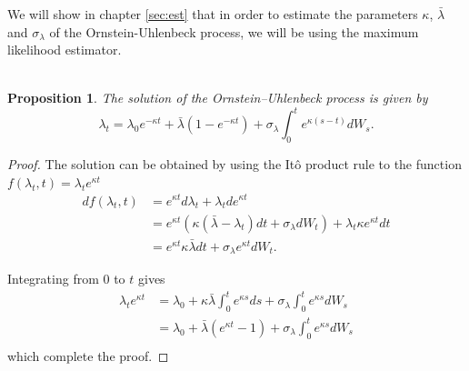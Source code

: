 \documentclass{article}
\newtheorem{prop}[thm]{Proposition}
\theoremstyle{definition}
\theoremstyle{remark}
\newcommand{\Ito}{It\^{o} }
\begin{document}
We will show in chapter \ref{sec:est} that in order to estimate the parameters $\kappa$, $\bar{\lambda}$ and $\sigma_\lambda$ of the Ornstein-Uhlenbeck process, we will be using the maximum likelihood estimator.\\
\\
\begin{prop}
The solution of the Ornstein--Uhlenbeck process is given by
\begin{equation*}
\lambda_t=\lambda_0e^{-\kappa t}+\bar{\lambda}(1-e^{-\kappa t})+\sigma_\lambda\int_0^t e^{\kappa (s-t)} dW_s.
\end{equation*}
\end{prop}

\begin{proof}
The solution can be obtained by using the \Ito product rule to the function $f(\lambda_t, t)=\lambda_te^{\kappa t}$
\begin{align*}
df(\lambda_t, t)&=e^{\kappa t}d\lambda_t+\lambda_tde^{\kappa t}\\
&=e^{\kappa t}\left(\kappa(\bar{\lambda}-\lambda_t)dt+\sigma_\lambda dW_t\right)+\lambda_t\kappa e^{\kappa t}dt\\
&=e^{\kappa t}\kappa\bar{\lambda}dt+\sigma_\lambda e^{\kappa t} dW_t.
\end{align*}

Integrating from $0$ to $t$ gives
\begin{align*}
\lambda_te^{\kappa t}&=\lambda_0+\kappa\bar{\lambda}\int_0^te^{\kappa s}ds+\sigma_\lambda\int_0^t e^{\kappa s} dW_s\\
&=\lambda_0+\bar{\lambda}(e^{\kappa t}-1)+\sigma_\lambda\int_0^t e^{\kappa s} dW_s\\
\end{align*}
which complete the proof.
\end{proof}
\end{document}
